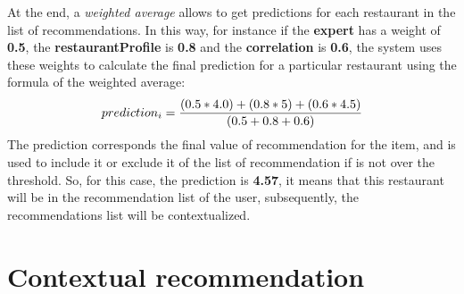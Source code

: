 At the end, a \textit{weighted average} allows to get predictions for
each restaurant in the list of recommendations. In this way, for
instance if the \textbf{expert} has a weight of \textbf{0.5}, the
\textbf{restaurantProfile} is \textbf{0.8} and the
\textbf{correlation} is \textbf{0.6}, the system uses these weights to
calculate the final prediction for a particular restaurant using the
formula of the weighted average:
\begin{equation}\label{eq:prediction}
\displaystyle prediction_{i} = {(0.5 * 4.0) + ( 0.8 * 5) + (0.6 * 4.5)
\over (0.5 + 0.8 + 0.6)}
\end{equation}
The prediction corresponds the final value of recommendation for the
item, and is used to include it or exclude it of the list of
recommendation if is not over the threshold. So, for this case, the
prediction is \textbf{4.57}, it means that this restaurant will be in the
recommendation list of the user, subsequently, the recommendations
list will be contextualized.


\section{Contextual recommendation} 

